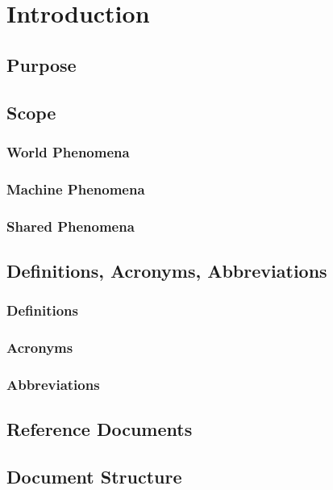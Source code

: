 \chapter{Introduction}

\section{Purpose}

\section{Scope}
\subsection{World Phenomena}
\subsection{Machine Phenomena}
\subsection{Shared Phenomena}

\section{Definitions, Acronyms, Abbreviations}
\subsection{Definitions}
\subsection{Acronyms}
\subsection{Abbreviations}

\section{Reference Documents}

\section{Document Structure}